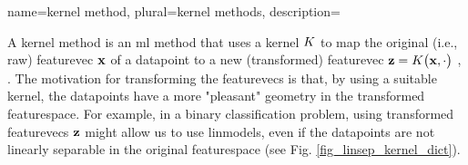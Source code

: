 {name={kernel method}, 
plural={kernel methods}, 
	description={A \gls{kernel} method is an \gls{ml} method that uses a 
		\gls{kernel} $K$ to map the original (i.e., raw) \gls{featurevec} ${\bf x}$ of a 
		\gls{datapoint} to a new (transformed) \gls{featurevec} ${\bf z} = K\big({\bf x},\cdot\big)$ \cite{LearningKernelsBook}, \cite{LampertNowKernel}.
		The motivation for transforming the \glspl{featurevec} is that, by using a suitable \gls{kernel}, 
		the \glspl{datapoint} have a more "pleasant" geometry in the transformed \gls{featurespace}. 
		For example, in a binary \gls{classification} problem, using transformed \glspl{featurevec} ${\bf z}$ might 
		allow us to use \glspl{linmodel}, even if the \glspl{datapoint} are not linearly 
		separable in the original \gls{featurespace} (see Fig. \ref{fig_linsep_kernel_dict}). 
\begin{figure}[H]
\begin{center}
\end{center}
\end{figure}}}
